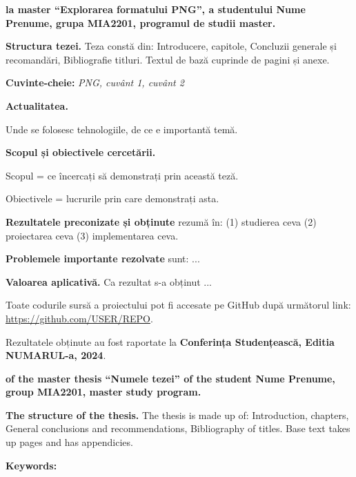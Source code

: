 \documentclass[a4paper,12pt]{report}
\newcommand{\thesisTitleEng}{Numele tezei} %
\newcommand{\uniGroupName}{MIA2201}
\newcommand{\authorName}{Nume Prenume} %
\newcommand{\thesisTitle}{Explorarea formatului PNG}
\newcommand{\thesisType}{master} %
\newcommand{\programulDeStudii}{master} %
\renewcommand{\year}{2024}
\newcommand{\conferencesList}{Conferința Studențească, Editia NUMARUL-a, \year}
\newcommand{\github}{\url{https://github.com/USER/REPO}}
\begin{document}
\titlePage

\clearpage
\tableofcontents

\clearpage
{} %

\textbf{la \thesisType{} ``\thesisTitle{}'', a studentului \authorName{}, grupa \uniGroupName{}, programul de studii \programulDeStudii.}

\textbf{Structura tezei.}
Teza constă din: Introducere, \chapterCount{} capitole, Concluzii generale și recomandări, Bibliografie \bibliographyEntryCount{} titluri.
Textul de bază cuprinde \usefulPageCount{} de pagini și \anexeCount{} anexe.

\textbf{Cuvinte-cheie:}
\textit{\acs{PNG}, cuvânt 1, cuvânt 2}

\textbf{Actualitatea.}

Unde se folosesc tehnologiile, de ce e importantă temă.

\textbf{Scopul și obiectivele cercetării.}

Scopul = ce încercați să demonstrați prin această teză.

Obiectivele = lucrurile prin care demonstrați asta.

\textbf{Rezultatele preconizate și obținute} rezumă în: 
(1) studierea ceva
(2) proiectarea ceva
(3) implementarea ceva.

\textbf{Problemele importante rezolvate} sunt: ...

\textbf{Valoarea aplicativă.} Ca rezultat s-a obținut ...

Toate codurile sursă a proiectului pot fi accesate pe GitHub după următorul link: \github.

Rezultatele obținute au fost raportate la \textbf{\conferencesList}\cite{self}.

\clearpage
{} %

\textbf{of the \thesisType{} thesis  ``\thesisTitleEng'' of the student \authorName{}, group \uniGroupName{}, \programulDeStudii{} study program.}

\textbf{The structure of the thesis.}
The thesis is made up of: Introduction, \chapterCount{} chapters,
General conclusions and recommendations, Bibliography of \bibliographyEntryCount{} titles.
Base text takes up \usefulPageCount{} pages and has \anexeCount{} appendicies.

\textbf{Keywords:}
\textit{}
\end{document}
